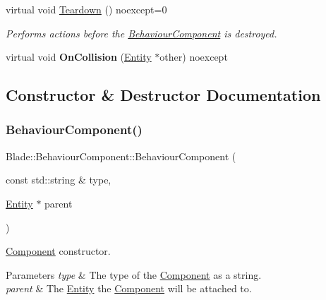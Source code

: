\begin{DoxyCompactItemize}
\mbox{\label{class_blade_1_1_behaviour_component_a017af86093f174c2b376064f557dcbac}} 
virtual void \hyperlink{class_blade_1_1_behaviour_component_a017af86093f174c2b376064f557dcbac}{Teardown} () noexcept=0
\begin{DoxyCompactList}\small\item\em Performs actions before the \hyperlink{class_blade_1_1_behaviour_component}{Behaviour\+Component} is destroyed. \end{DoxyCompactList}\item 
\mbox{\label{class_blade_1_1_behaviour_component_a3258a2802f2338855ae2bedb30fe82e7}} 
virtual void {\bfseries On\+Collision} (\hyperlink{class_blade_1_1_entity}{Entity} $\ast$other) noexcept
\end{DoxyCompactItemize}


\subsection{Constructor \& Destructor Documentation}
\mbox{\label{class_blade_1_1_behaviour_component_a64cc587591d1b38147ce1dbfb8283f7b}} 
\subsubsection{\texorpdfstring{Behaviour\+Component()}{BehaviourComponent()}}
{\footnotesize\ttfamily Blade\+::\+Behaviour\+Component\+::\+Behaviour\+Component (\begin{DoxyParamCaption}\item[{const std\+::string \&}]{type,  }\item[{\hyperlink{class_blade_1_1_entity}{Entity} $\ast$}]{parent }\end{DoxyParamCaption})}



\hyperlink{class_blade_1_1_component}{Component} constructor. 


\begin{DoxyParams}{Parameters}
{\em type} & The type of the \hyperlink{class_blade_1_1_component}{Component} as a string. \\
\hline
{\em parent} & The \hyperlink{class_blade_1_1_entity}{Entity} the \hyperlink{class_blade_1_1_component}{Component} will be attached to. \\
\hline
\end{DoxyParams}


